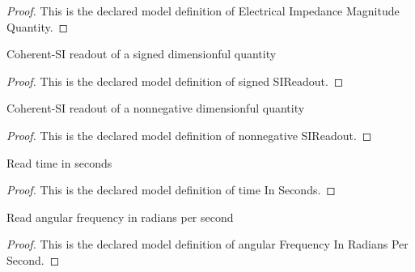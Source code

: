 \begin{proof}
  This is the declared model definition of Electrical Impedance Magnitude Quantity.
\end{proof}
\begin{definition}
  \label{def:physics:phyx-mini-0888:phyxminiproblems-problemphyxmini0888-signedsireadout}
  Coherent-SI readout of a signed dimensionful quantity
\end{definition}
\begin{proof}
  This is the declared model definition of signed SIReadout.
\end{proof}
\begin{definition}
  \label{def:physics:phyx-mini-0888:phyxminiproblems-problemphyxmini0888-nonnegativesireadout}
  Coherent-SI readout of a nonnegative dimensionful quantity
\end{definition}
\begin{proof}
  This is the declared model definition of nonnegative SIReadout.
\end{proof}
\begin{definition}
  \label{def:physics:phyx-mini-0888:phyxminiproblems-problemphyxmini0888-timeinseconds}
  Read time in seconds
\end{definition}
\begin{proof}
  This is the declared model definition of time In Seconds.
\end{proof}
\begin{definition}
  \label{def:physics:phyx-mini-0888:phyxminiproblems-problemphyxmini0888-angularfrequencyinradianspersecond}
  Read angular frequency in radians per second
\end{definition}
\begin{proof}
  This is the declared model definition of angular Frequency In Radians Per Second.
\end{proof}

